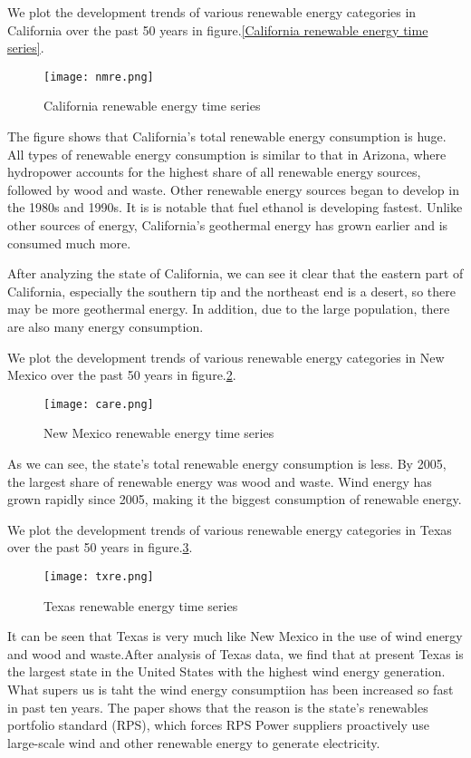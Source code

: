 \documentclass{mcmthesis}
\begin{document}
We plot the development trends of various renewable energy categories in California over the past 50 years in figure.\ref{California renewable energy time series}.
\begin{figure}[htb]
  \centering
  \texttt{[image: nmre.png]}
  \caption{California renewable energy time series} \label{fig: California renewable energy time series}
\end{figure}

The figure shows that California's total renewable energy consumption is huge. All types of renewable energy consumption is similar to that in Arizona, where hydropower accounts for the highest share of all renewable energy sources, followed by wood and waste. Other renewable energy sources began to develop in the 1980s and 1990s. It is is notable that fuel ethanol is developing fastest. Unlike other sources of energy, California's geothermal energy has grown earlier and is consumed much more.

After analyzing the state of California, we can see it clear that the eastern part of California, especially the southern tip and the northeast end is a desert, so there may be more geothermal energy. In addition, due to the large population, there are also many energy consumption.

We plot the development trends of various renewable energy categories in New Mexico over the past 50 years in figure.\ref{fig: New Mexico renewable energy time series}.
\begin{figure}[htb]
  \centering
  \texttt{[image: care.png]}
  \caption{New Mexico renewable energy time series} \label{fig: New Mexico renewable energy time series}
\end{figure}

As we can see, the state's total renewable energy consumption is less. By 2005, the largest share of renewable energy was wood and waste. Wind energy has grown rapidly since 2005, making it the biggest consumption of renewable energy.

We plot the development trends of various renewable energy categories in Texas over the past 50 years in figure.\ref{fig: Texas renewable energy time series}.
\begin{figure}[htb]
  \centering
  \texttt{[image: txre.png]}
  \caption{Texas renewable energy time series} \label{fig: Texas renewable energy time series}
\end{figure}

It can be seen that Texas is very much like New Mexico in the use of wind energy and wood and waste.After analysis of Texas data, we find that at present Texas is the largest state in the United States with the highest wind energy generation. What supers us is taht the wind energy consumptiion has been increased so fast in past ten years. The paper \cite{Langniss2003The} shows that the reason is the state's renewables portfolio standard (RPS), which forces RPS Power suppliers proactively use large-scale wind and other renewable energy to generate electricity.
\end{document}
